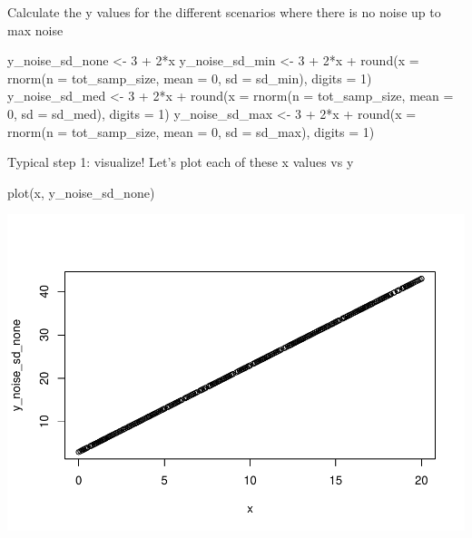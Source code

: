 \documentclass[
]{book}
\newenvironment{Shaded}{\begin{snugshade}}{\end{snugshade}}
\newcommand{\AttributeTok}[1]{\textcolor[rgb]{0.77,0.63,0.00}{#1}}
\newcommand{\DecValTok}[1]{\textcolor[rgb]{0.00,0.00,0.81}{#1}}
\newcommand{\FunctionTok}[1]{\textcolor[rgb]{0.00,0.00,0.00}{#1}}
\newcommand{\NormalTok}[1]{#1}
\newcommand{\OtherTok}[1]{\textcolor[rgb]{0.56,0.35,0.01}{#1}}
\newcommand{\SpecialCharTok}[1]{\textcolor[rgb]{0.00,0.00,0.00}{#1}}
\begin{document}
Calculate the y values for the different scenarios where there is no noise up to max noise

\begin{Shaded}
\begin{Highlighting}[]
\NormalTok{y\_noise\_sd\_none }\OtherTok{\textless{}{-}} \DecValTok{3} \SpecialCharTok{+} \DecValTok{2}\SpecialCharTok{*}\NormalTok{x}
\NormalTok{y\_noise\_sd\_min }\OtherTok{\textless{}{-}} \DecValTok{3} \SpecialCharTok{+} \DecValTok{2}\SpecialCharTok{*}\NormalTok{x }\SpecialCharTok{+} \FunctionTok{round}\NormalTok{(}\AttributeTok{x =} \FunctionTok{rnorm}\NormalTok{(}\AttributeTok{n =}\NormalTok{ tot\_samp\_size, }\AttributeTok{mean =} \DecValTok{0}\NormalTok{, }\AttributeTok{sd =}\NormalTok{ sd\_min), }\AttributeTok{digits =} \DecValTok{1}\NormalTok{)}
\NormalTok{y\_noise\_sd\_med }\OtherTok{\textless{}{-}} \DecValTok{3} \SpecialCharTok{+} \DecValTok{2}\SpecialCharTok{*}\NormalTok{x }\SpecialCharTok{+} \FunctionTok{round}\NormalTok{(}\AttributeTok{x =} \FunctionTok{rnorm}\NormalTok{(}\AttributeTok{n =}\NormalTok{ tot\_samp\_size, }\AttributeTok{mean =} \DecValTok{0}\NormalTok{, }\AttributeTok{sd =}\NormalTok{ sd\_med), }\AttributeTok{digits =} \DecValTok{1}\NormalTok{)}
\NormalTok{y\_noise\_sd\_max }\OtherTok{\textless{}{-}} \DecValTok{3} \SpecialCharTok{+} \DecValTok{2}\SpecialCharTok{*}\NormalTok{x }\SpecialCharTok{+} \FunctionTok{round}\NormalTok{(}\AttributeTok{x =} \FunctionTok{rnorm}\NormalTok{(}\AttributeTok{n =}\NormalTok{ tot\_samp\_size, }\AttributeTok{mean =} \DecValTok{0}\NormalTok{, }\AttributeTok{sd =}\NormalTok{ sd\_max), }\AttributeTok{digits =} \DecValTok{1}\NormalTok{)}
\end{Highlighting}
\end{Shaded}

Typical step 1: visualize! Let's plot each of these x values vs y

\begin{Shaded}
\begin{Highlighting}[]
\FunctionTok{plot}\NormalTok{(x, y\_noise\_sd\_none)}
\end{Highlighting}
\end{Shaded}

\includegraphics{test_course_notes_files/figure-latex/unnamed-chunk-80-1.pdf}
\end{document}
